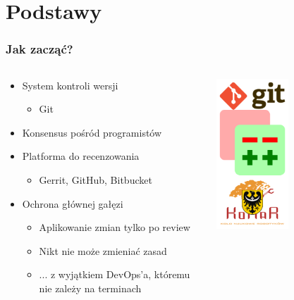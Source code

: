 \documentclass[xcolor=dvipsnames]{beamer}%
\begin{document}
\section{Podstawy}

\begin{frame}
	\frametitle{Jak zacząć?}
	\begin{columns}
		\begin{column}{0.5\textwidth}
			\begin{itemize}
				\item System kontroli wersji
				      \begin{itemize}
					      \item Git
				      \end{itemize}
				\item Konsensus pośród programistów
				\item Platforma do recenzowania
				      \begin{itemize}
					      \item Gerrit, GitHub, Bitbucket
				      \end{itemize}
				\item Ochrona głównej gałęzi
				      \begin{itemize}
					      \item Aplikowanie zmian tylko po review
					      \item Nikt nie może zmieniać zasad
					      \item ... z wyjątkiem DevOps'a, któremu nie zależy na terminach
				      \end{itemize}
			\end{itemize}
		\end{column}
		\begin{column}{0.5\textwidth}
			\begin{center}
				\includegraphics[width=0.5\textwidth,keepaspectratio]{figure/podstawy.png}

\end{center}
\end{column}
\end{columns}
\end{frame}
\end{document}
